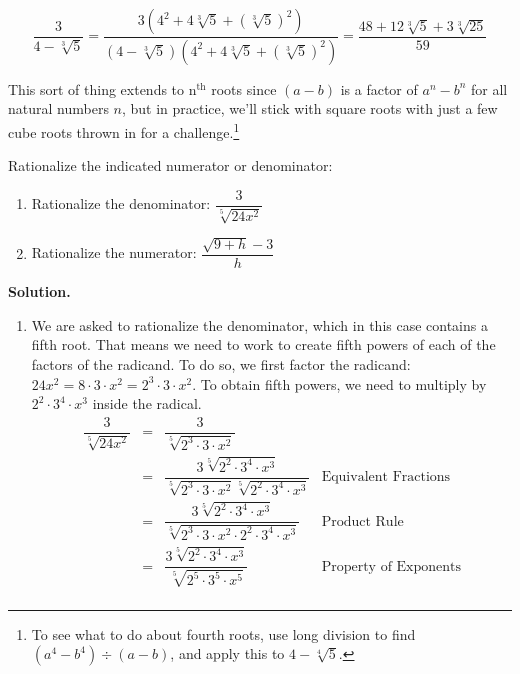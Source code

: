 \[ \dfrac{3}{4 - \sqrt[3]{5}} = \dfrac{3(4^2 + 4\sqrt[3]{5} + (\sqrt[3]{5})^2)}{(4 - \sqrt[3]{5})(4^2 + 4\sqrt[3]{5} + (\sqrt[3]{5})^2)} = \dfrac{48 + 12\sqrt[3]{5}+ 3\sqrt[3]{25}}{59}\]

This sort of thing extends to $\text{n}^{\text{th}}$ roots since $(a-b)$ is a factor of $a^n - b^n$ for all natural numbers $n$, but in practice, we'll stick with square roots with just a few cube roots thrown in for a challenge.\footnote{To see what to do about fourth roots, use long division to find $(a^4 - b^4) \div (a-b)$, and apply this to $4 - \sqrt[4]{5}$.}

\begin{ex} \label{rationalizenumdenom} Rationalize the indicated numerator or denominator:

\begin{multicols}{2}
\begin{enumerate}

\item  Rationalize the denominator:  $\dfrac{3}{\sqrt[5]{24x^2}}$

\item  Rationalize the numerator: $\dfrac{\sqrt{9 + h} - 3}{h}$

\setcounter{HW}{\value{enumi}}

\end{enumerate}
\end{multicols}

{\bf Solution.}

\begin{enumerate}

\item We are asked to rationalize the denominator, which in this case contains a fifth root.  That means we need to work to create fifth powers of each of the factors of the radicand.  To do so, we first factor the radicand:  $24x^2 = 8 \cdot 3 \cdot x^2 = 2^3 \cdot 3 \cdot x^2$.  To obtain fifth powers, we need to multiply by $2^2 \cdot 3^4 \cdot x^3$ inside the radical.  \[ \begin{array}{rclr}

\dfrac{3}{\sqrt[5]{24x^2}} & = & \dfrac{3}{\sqrt[5]{2^3 \cdot 3 \cdot x^2}} & \\ [12pt]
                           & = & \dfrac{3 \sqrt[5]{2^2 \cdot 3^4 \cdot x^3}}{\sqrt[5]{2^3 \cdot 3 \cdot x^2}\sqrt[5]{2^2 \cdot 3^4 \cdot x^3}} & \text{Equivalent Fractions} \\[12pt]
												& = & \dfrac{3 \sqrt[5]{2^2 \cdot 3^4 \cdot x^3}}{\sqrt[5]{2^3 \cdot 3 \cdot x^2 \cdot 2^2 \cdot 3^4 \cdot x^3}} & \text{Product Rule} \\[12pt]
													& = & \dfrac{3 \sqrt[5]{2^2 \cdot 3^4 \cdot x^3}}{\sqrt[5]{2^5 \cdot 3^5 \cdot x^5}} & \text{Property of Exponents}\\[12pt]
													

\end{array}\]
\end{enumerate}
\end{ex}
